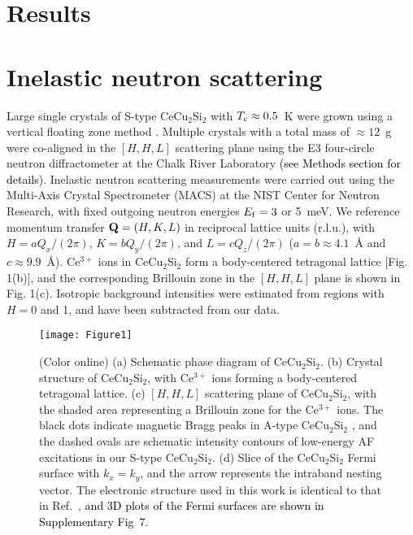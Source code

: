 \documentclass[aps,prl,onecolumn,amsmath,amssymb,superscriptaddress]{revtex4}
\newcommand{\ys}{\textcolor{black}}
\newcommand{\yy}{\textcolor{black}}
\begin{document}
\section{Results}
\section{Inelastic neutron scattering}
Large single crystals of S-type CeCu$_2$Si$_2$  with $T_{\rm c}\approx0.5$~K were grown using a vertical floating zone method \cite{CCao2011}. 
Multiple crystals with a total mass of $\approx12$~g were co-aligned in the $[H,H,L]$ scattering plane using the E3 four-circle neutron diffractometer at the Chalk River Laboratory \ys{(see Methods section for details)}. Inelastic neutron scattering measurements were carried out using the Multi-Axis Crystal Spectrometer (MACS) \cite{JRodriguez} at the NIST Center for Neutron Research, with fixed outgoing neutron energies $E_{\rm f}=3$ or 5~meV. We reference momentum transfer ${\bf Q}=(H,K,L)$ in reciprocal lattice units (r.l.u.), with $H=a Q_x/(2\pi)$, $K=b Q_y/(2\pi)$, and $L=cQ_z/(2\pi)$ ($a=b\approx4.1$~{\AA} and $c\approx9.9$~{\AA}). Ce$^{3+}$ ions in CeCu$_2$Si$_2$ form a body-centered tetragonal lattice [Fig. 1(b)], and the corresponding Brillouin zone in the $[H,H,L]$ plane is shown in Fig. 1(c). Isotropic background intensities were estimated from regions with $H=0$ and 1, and have been subtracted from our data. 

\begin{figure}[t]
	\texttt{[image: Figure1]}
	\caption{
		(Color online) (a) Schematic phase diagram of CeCu$_2$Si$_2$. (b) Crystal structure of CeCu$_2$Si$_2$, with Ce$^{3+}$ ions forming a body-centered tetragonal lattice. (c) $[H,H,L]$ scattering plane of CeCu$_2$Si$_2$, with the shaded area representing a Brillouin zone for the Ce$^{3+}$ ions. The black dots indicate magnetic Bragg peaks in A-type CeCu$_2$Si$_2$ \cite{OStockert2004}, and the dashed ovals are schematic intensity contours of low-energy AF excitations in our S-type CeCu$_2$Si$_2$. (d) Slice of the CeCu$_2$Si$_2$ Fermi surface with $k_x=k_y$, and the arrow represents the intraband nesting vector. The electronic structure used in this work is identical to that in Ref.~\cite{YLi2018}, \yy{and 3D plots of the Fermi surfaces are shown in Supplementary Fig~7}.
	}
\end{figure}
\end{document}
